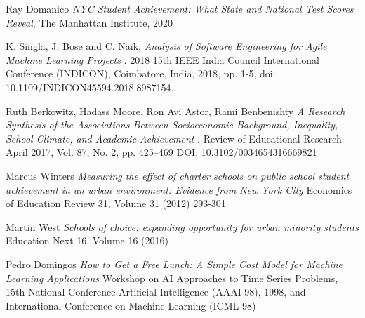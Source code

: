 \documentclass[sigconf,nonacm,11pt]{acmart}
\begin{document}
\begin{thebibliography}{9}

Ray Domanico
\textit{NYC Student Achievement: What State and National Test Scores Reveal}, 
The Manhattan Institute, 2020

K. Singla, J. Bose and C. Naik, 
\textit{Analysis of Software Engineering for Agile Machine Learning Projects }.
2018 15th IEEE India Council International Conference (INDICON), Coimbatore, India, 2018, pp. 1-5, doi: 10.1109/INDICON45594.2018.8987154.

Ruth Berkowitz, Hadass Moore, Ron Avi Astor, Rami Benbenishty
\textit{A Research Synthesis of the Associations Between Socioeconomic Background, Inequality, School Climate, and Academic Achievement }.
Review of Educational Research April 2017, Vol. 87, No. 2, pp. 425–469 DOI: 10.3102/0034654316669821

Marcus Winters
\textit{Measuring the effect of charter schools on public school student achievement in an urban environment: Evidence from New York City}
Economics of Education Review 31, Volume 31 (2012) 293-301

Martin West
\textit{Schools of choice: expanding opportunity for urban minority students}
Education Next 16, Volume 16 (2016)

Pedro Domingos
\textit{How to Get a Free Lunch: A Simple Cost Model for Machine Learning Applications}
Workshop on AI Approaches to Time Series Problems, 15th National Conference Artificial Intelligence (AAAI-98), 1998, and International Conference on Machine Learning (ICML-98)

\end{thebibliography}



\end{document}
